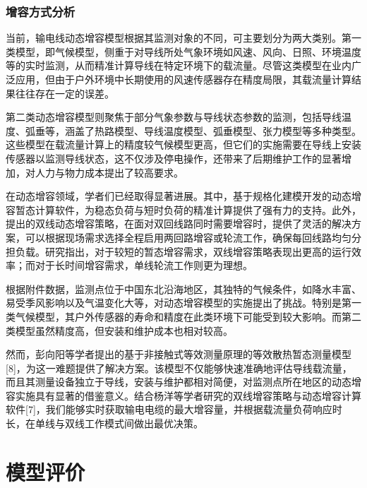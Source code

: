 \documentclass[a4paper,12.045pt]{ctexart}
\begin{document}
	\subsubsection{增容方式分析}
	当前，输电线动态增容模型根据其监测对象的不同，可主要划分为两大类别。第一类模型，即气候模型，侧重于对导线所处气象环境如风速、风向、日照、环境温度等的实时监测，从而精准计算导线在特定环境下的载流量。尽管这类模型在业内广泛应用，但由于户外环境中长期使用的风速传感器存在精度局限，其载流量计算结果往往存在一定的误差。
	\par
	第二类动态增容模型则聚焦于部分气象参数与导线状态参数的监测，包括导线温度、弧垂等，涵盖了热路模型、导线温度模型、弧垂模型、张力模型等多种类型。这些模型在载流量计算上的精度较气候模型更高，但它们的实施需要在导线上安装传感器以监测导线状态，这不仅涉及停电操作，还带来了后期维护工作的显著增加，对人力与物力成本提出了较高要求。
	\par
	在动态增容领域，学者们已经取得显著进展。其中，基于规格化建模开发的动态增容暂态计算软件，为稳态负荷与短时负荷的精准计算提供了强有力的支持。此外，提出的双线动态增容策略，在面对双回线路同时需要增容时，提供了灵活的解决方案，可以根据现场需求选择全程启用两回路增容或轮流工作，确保每回线路均匀分担负载。研究指出，对于较短的暂态增容需求，双线增容策略表现出更高的运行效率；而对于长时间增容需求，单线轮流工作则更为理想。
	\par
	根据附件数据，监测点位于中国东北沿海地区，其独特的气候条件，如降水丰富、易受季风影响以及气温变化大等，对动态增容模型的实施提出了挑战。特别是第一类气候模型，其户外传感器的寿命和精度在此类环境下可能受到较大影响。而第二类模型虽然精度高，但安装和维护成本也相对较高。
	\par
	然而，彭向阳等学者提出的基于非接触式等效测量原理的等效散热暂态测量模型[8]，为这一难题提供了解决方案。该模型不仅能够快速准确地评估导线载流量，而且其测量设备独立于导线，安装与维护都相对简便，对监测点所在地区的动态增容实施具有显著的借鉴意义。结合杨洋等学者研究的双线增容策略与动态增容计算软件[7]，我们能够实时获取输电电缆的最大增容量，并根据载流量负荷响应时长，在单线与双线工作模式间做出最优决策。
	
	\section{模型评价}
\end{document}

